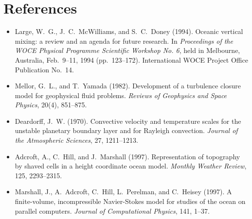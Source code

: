 \documentclass[11pt, a4paper]{article}
\begin{document}
\section{References}

\begin{itemize}
    \item Large, W.\ G., J.\ C.\ McWilliams, and S.\ C.\ Doney (1994). Oceanic vertical mixing: a review and an agenda for future research. In \textit{Proceedings of the WOCE Physical Programme Scientific Workshop No. 6}, held in Melbourne, Australia, Feb.\ 9--11, 1994 (pp.\ 123--172). International WOCE Project Office Publication No.\ 14.
    
    \item Mellor, G.\ L., and T.\ Yamada (1982). Development of a turbulence closure model for geophysical fluid problems. \textit{Reviews of Geophysics and Space Physics}, 20(4), 851–875.
    
    \item Deardorff, J.\ W. (1970). Convective velocity and temperature scales for the unstable planetary boundary layer and for Rayleigh convection. \textit{Journal of the Atmospheric Sciences}, 27, 1211–1213.
    
    \item Adcroft, A., C.\ Hill, and J.\ Marshall (1997). Representation of topography by shaved cells in a height coordinate ocean model. \textit{Monthly Weather Review}, 125, 2293–2315.
    
    \item Marshall, J., A.\ Adcroft, C.\ Hill, L.\ Perelman, and C.\ Heisey (1997). A finite-volume, incompressible Navier-Stokes model for studies of the ocean on parallel computers. \textit{Journal of Computational Physics}, 141, 1–37.
\end{itemize}
\end{document}
